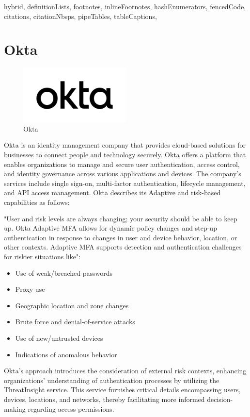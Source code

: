 \documentclass[
  digital,     %
  oneside,     %
  nosansbold,  %
  nocolorbold, %
  lof,         %
  lot,         %
]{fithesis4}
\begin{document}
\begin{markdown*}{%
  hybrid,
  definitionLists,
  footnotes,
  inlineFootnotes,
  hashEnumerators,
  fencedCode,
  citations,
  citationNbsps,
  pipeTables,
  tableCaptions,
}
\newpage
\section{Okta}

\begin{figure}[htbp]
  \centering
  \includegraphics[width=0.5\textwidth]{img/okta.png}
  \caption{Okta}
  \label{fig:okta-logo}
\end{figure}

Okta is an identity management company that provides cloud-based solutions for businesses to connect people and technology securely.
Okta offers a platform that enables organizations to manage and secure user authentication, access control, and identity governance across various applications and devices.
The company's services include single sign-on, multi-factor authentication, lifecycle management, and API access management.
Okta describes its Adaptive and risk-based capabilities as follows:

"User and risk levels are always changing; your security should be able to keep up.
Okta Adaptive MFA allows for dynamic policy changes and step-up authentication in response to changes in user and device behavior, location, or other contexts.
Adaptive MFA supports detection and authentication challenges for riskier situations like":


\begin{itemize}
    \item Use of weak/breached passwords
    \item Proxy use
    \item Geographic location and zone changes
    \item Brute force and denial-of-service attacks
    \item Use of new/untrusted devices
    \item Indications of anomalous behavior
\end{itemize}

\newpage
Okta's approach introduces the consideration of external risk contexts, enhancing organizations' understanding of authentication processes by utilizing the ThreatInsight service.
This service furnishes critical details encompassing users, devices, locations, and networks, thereby facilitating more informed decision-making regarding access permissions.


\end{markdown*}
\end{document}
